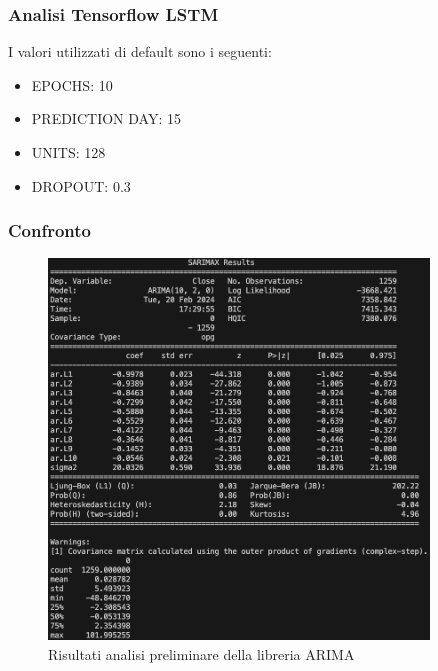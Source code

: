 \documentclass[a4paper,12pt]{article}
\begin{document}
            \subsubsection{Analisi Tensorflow LSTM} I valori utilizzati di 
            default sono i seguenti:
            \begin{itemize}
                \item EPOCHS: 10
                \item PREDICTION DAY: 15
                \item UNITS: 128
                \item DROPOUT: 0.3
            \end{itemize}
            \subsubsection{Confronto}
            \begin{figure}[H]
                \centering
                \includegraphics[width=0.9\textwidth]{ARIMA2.png}
                \caption{Risultati analisi preliminare della libreria 
                ARIMA}
            \end{figure}
\end{document}
